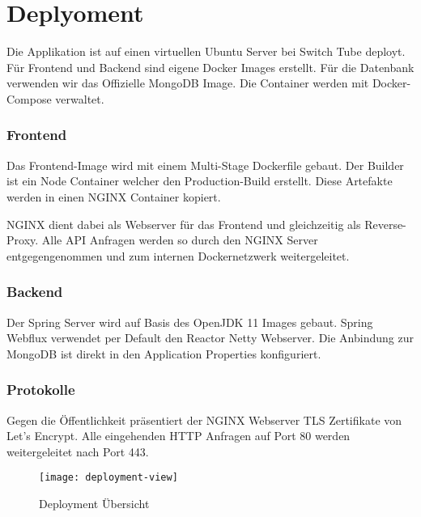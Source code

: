 \section{Deplyoment}

Die Applikation ist auf einen virtuellen Ubuntu Server bei Switch Tube deployt.
Für Frontend und Backend sind eigene Docker Images erstellt.
Für die Datenbank verwenden wir das Offizielle MongoDB Image.
Die Container werden mit Docker-Compose verwaltet.

\subsubsection*{Frontend}
Das Frontend-Image wird mit einem Multi-Stage Dockerfile gebaut.
Der Builder ist ein Node Container welcher den Production-Build erstellt.
Diese Artefakte werden in einen NGINX Container kopiert.

NGINX dient dabei als Webserver für das Frontend und gleichzeitig als Reverse-Proxy.
Alle API Anfragen werden so durch den NGINX Server entgegengenommen und zum internen Dockernetzwerk weitergeleitet.

\subsubsection*{Backend}
Der Spring Server wird auf Basis des OpenJDK 11 Images gebaut.
Spring Webflux verwendet per Default den Reactor Netty Webserver.
Die Anbindung zur MongoDB ist direkt in den Application Properties konfiguriert.


\subsubsection*{Protokolle}
Gegen die Öffentlichkeit präsentiert der NGINX Webserver TLS Zertifikate von Let's Encrypt.
Alle eingehenden HTTP Anfragen auf Port 80 werden weitergeleitet nach Port 443.


\begin{figure}[H]
    \texttt{[image: deployment-view]}
    \caption{Deployment Übersicht}
    \label{fig:Deplyoment}
\end{figure}

